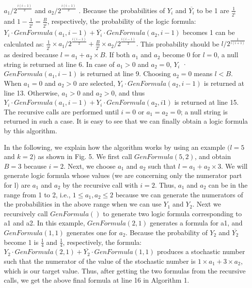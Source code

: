 \documentclass[10pt,conference]{IEEEtran}
\begin{document}
\noindent
$a_1/2^\frac{i(i-1)}{2}$ and $a_2/2^\frac{i(i-1)}{2}$ . Because the probabilities of $Y_i$
and $\overline{Y_i}$ to be 1 are $\frac{1}{2^i}$ and $1 −\frac{1}{2^i} = \frac{B}{2^i}$, respectively, the probability of the logic formula: $Y_i \cdot GenFormula(a_1, i −
1) + \overline {Y_i}\cdot GenFormula(a_2, i−1)$ becomes 1 can be calculated
as: $\frac{1}{2^i}\times a_1/2^\frac{i(i-1)}{2} + \frac{B}{2^i}\times a_2/2^\frac{i(i-1)}{2}.$ This probability should be $l/{2^\frac{1}{i(i+1)}}$ as desired because $l = a_1 + a_2 \times B$. If both $a_1$ and $a_2$ become 0 for $l = 0$, a null string is returned at line 6.
In case of $a_1 > 0$ and $a_2 = 0$, $Y_i$ · ${GenF ormula(a_1, i - 1)}$
is returned at line 9. Choosing $a_2 = 0$ means $ l < B$. When
$a_1 = 0$ and $a_2 > 0$ are selected, $Y_i \cdot GenFormula(a_2, i - 1)$
is returned at line 13. Otherwise, $a_1 > 0$ and $a_2 > 0$, and thus
$Y_i \cdot GenFormula(a_1, i - 1) + Y_i \cdot GenFormula(a_2, i  1)$
is returned at line 15. The recursive calls are performed until
$i = 0$ or $a_1 = a_2 = 0$; a null string is returned in such a case.
It is easy to see that we can finally obtain a logic formula by
this algorithm.

\par
In the following, we explain how the algorithm works by
using an example $(l = 5$ and $k = 2)$ as shown in Fig. 5.
We first call $GenFormula(5, 2)$, and obtain $B = 3$ because
$i = 2$. Next, we choose $a_1$ and $a_2$ such that $l = a_1+a_2\times3$. We
will generate logic formula whose values (we are concerning
only the numerator part for l) are $a_1$ and $a_2$ by the recursive
call with $i = 2$. Thus, $a_1$ and $a_2$ can be in the range from
1 to 2, i.e., $1 \leq a_1, a_2 \leq 2$ because we can generate the
numerators of the probabilities in the above range when we
can use $Y_1$ and $Y_2$. Next we recursively call $GenFormula()$
to generate two logic formula corresponding to a1 and a2.
In this example, $GenFormula(2, 1)$ generates a formula for
a1, and $GenFormula(1, 1)$ generates one for $a_2$. Because the
probability of $Y_2$ and $\overline{Y_2}$ become 1 is $\frac{1}{4}$ and $\frac{1}{4}$, respectively, the formula: $Y_2 \cdot GenFormula(2, 1)+ \overline {Y_2} \cdot GenFormula(1, 1)$ produces a stochastic number such that the numerator of the value of the stochastic number is $1 \times a_1 + 3 \times a_2$, which is our target value. Thus, after getting the two formulas from the recursive calls, we get the above final formula at line 16 in
Algorithm 1.
\end{document}
